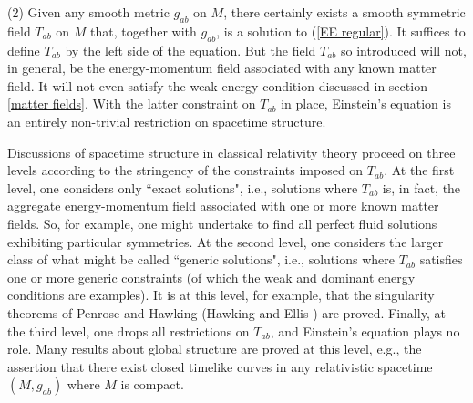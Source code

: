 \documentclass [12] {article}
\theoremstyle{plain}
\numberwithin{figure}{subsection}
\numberwithin{proposition}{subsection}
\begin{document}
%
%


(2) Given any smooth metric $g_{ab}$ on $M$, there certainly exists a smooth symmetric field $T_{ab}$ on $M$ that, together with $g_{ab}$, is a solution to (\ref{EE regular}). It suffices to define $T_{ab}$ by the left side of the equation.  But the field $T_{ab}$ so introduced will not, in general, be the energy-momentum field associated with any known matter field.  It will not even satisfy the weak energy condition discussed in section \ref{matter fields}. With the latter constraint on $T_{ab}$ in place, Einstein's equation is an entirely non-trivial restriction on spacetime structure. 

Discussions of spacetime structure in classical relativity theory proceed on three levels according to the stringency of the constraints imposed on $T_{ab}$.  At the first level, one considers only ``exact solutions", i.e., solutions where  $T_{ab}$ is, in fact,  the aggregate energy-momentum field associated with one or more known matter fields. So, for  example, one  might undertake to find all perfect fluid solutions exhibiting particular symmetries.   At the second level, one considers  the larger class of what might  be called ``generic solutions", i.e., solutions where $T_{ab}$ satisfies one or more generic constraints (of which the weak and dominant energy conditions are examples). It is at this level, for example,  that the singularity theorems of Penrose and Hawking (Hawking and Ellis ) are proved. Finally, at the third level, one drops all restrictions on $T_{ab}$, and Einstein's equation plays no role. Many results about global structure are proved at this level, e.g., the assertion that  there exist closed timelike curves in any relativistic spacetime $(M, g_{ab})$ where $M$ is compact.
\end{document}
